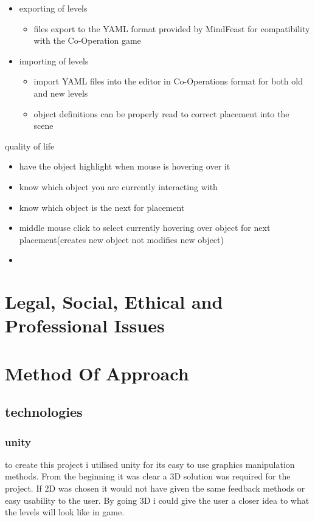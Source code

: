 \begin{itemize}
	\item exporting of levels
	\begin{itemize}
		\item files export to the YAML format provided by MindFeast for compatibility with the Co-Operation game
	\end{itemize}
	\item importing of levels
	\begin{itemize}
			\item import YAML files into the editor in Co-Operations format for both old and new levels
			\item object definitions can be properly read to correct placement into the scene
	\end{itemize}
\end{itemize}
quality of life
\begin{itemize}
	\item have the object highlight when mouse is hovering over it
	\item know which object you are currently interacting with
	\item know which object is the next for placement
	\item middle mouse click to select currently hovering over object for next placement(creates new object not modifies new object)
	\item 
\end{itemize}

\section{Legal, Social, Ethical and Professional Issues}

\section{Method Of Approach}

\subsection{technologies}
\subsubsection{unity}
to create this project i utilised unity for its easy to use graphics manipulation methods. From the beginning it was clear a 3D solution was required for the project. If 2D was chosen it would not have given the same feedback methods or easy usability to the user. By going 3D i could give the user a closer idea to what the levels will look like in game.

